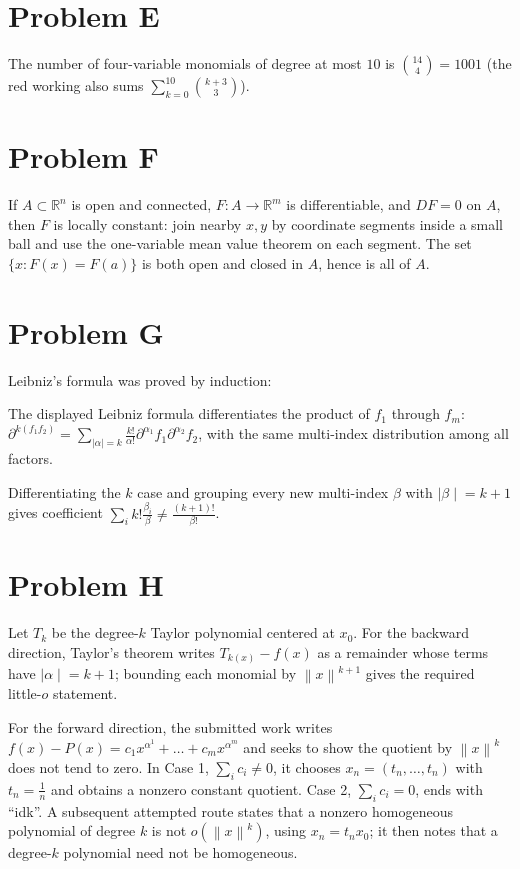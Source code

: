 \section{Problem E}

The number of four-variable monomials of degree at most \(10\) is \(\binom{14}{4} = 1001\) (the red working also sums \(\sum_{k = 0}^{10}\binom{k + 3}{3}\)).

\section{Problem F}

If \(A \subset \mathbb{R}^{n}\) is open and connected, \(F:A\rightarrow\mathbb{R}^{m}\) is differentiable, and \(DF = 0\) on \(A\), then \(F\) is locally constant: join nearby \(x,y\) by coordinate segments inside a small ball and use the one-variable mean value theorem on each segment. The set \(\{ x:F(x) = F(a)\}\) is both open and closed in \(A\), hence is all of \(A\).

\section{Problem G}

Leibniz's formula was proved by induction:

The displayed Leibniz formula differentiates the product of \(f_{1}\) through \(f_{m}\): \(\partial^{k{({f_{1}f_{2}})}} = \sum_{|\alpha| = k}\frac{k!}{\alpha!}\partial^{\alpha_{1}}f_{1}\partial^{\alpha_{2}}f_{2}\), with the same multi-index distribution among all factors.

Differentiating the \(k\) case and grouping every new multi-index \(\beta\) with \(\left. |\beta \middle| = k + 1 \right.\) gives coefficient \(\sum_{i}k!\frac{\beta_{i}}{\beta} \neq \frac{\left( {k + 1} \right)!}{\beta!}\).

\section{Problem H}

Let \(T_{k}\) be the degree-\(k\) Taylor polynomial centered at \(x_{0}\). For the backward direction, Taylor's theorem writes \(T_{k{(x)}} - f(x)\) as a remainder whose terms have \(\left. |\alpha \middle| = k + 1 \right.\); bounding each monomial by \(\left\| x \right\|^{k + 1}\) gives the required little-\(o\) statement.

For the forward direction, the submitted work writes \(f(x) - P(x) = c_{1}x^{\alpha^{1}} + \ldots + c_{m}x^{\alpha^{m}}\) and seeks to show the quotient by \(\left\| x \right\|^{k}\) does not tend to zero. In Case 1, \(\sum_{i}c_{i} \neq 0\), it chooses \(x_{n} = \left( {t_{n},\ldots,t_{n}} \right)\) with \(t_{n} = \frac{1}{n}\) and obtains a nonzero constant quotient. Case 2, \(\sum_{i}c_{i} = 0\), ends with ``idk''. A subsequent attempted route states that a nonzero homogeneous polynomial of degree \(k\) is not \(o\left( \left\| x \right\|^{k} \right)\), using \(x_{n} = t_{n}x_{0}\); it then notes that a degree-\(k\) polynomial need not be homogeneous.

